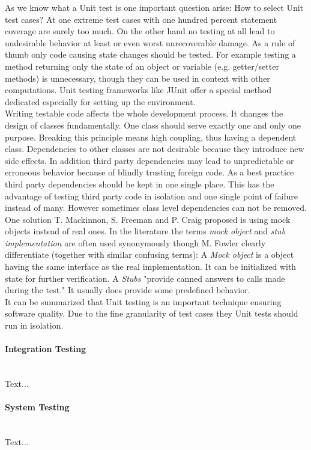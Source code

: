 \documentclass[12pt, notitlepage]{article}
\begin{document}
As we know what a Unit test is one important question arise: How to select Unit test cases? At one extreme test cases with one hundred percent statement coverage
are surely too much. On the other hand no testing at all lead to undesirable behavior at least or even worst unrecoverable damage. 
As a rule of thumb only code causing state changes should be tested. For example testing a method returning only the state of an object or variable (e.g. getter/setter methods) is unnecessary, though they can be used in context with other computations. Unit testing frameworks 
like JUnit\cite{junit} offer a special method dedicated especially for setting up the environment.\\
Writing testable code affects the whole development process. It changes the design of classes fundamentally. One class should serve exactly one and only one purpose. Breaking this principle means high coupling, thus having a dependent class. Dependencies to other classes are not desirable because they introduce new
side effects. In addition third party dependencies may lead to unpredictable or erroneous behavior because of blindly trusting foreign code.
As a best practice third party dependencies should be kept in one single place. This has the advantage of testing third party code in isolation 
and one single point of failure instead of many. However sometimes class level dependencies can not be removed.
One solution T. Mackinnon, S. Freeman and P. Craig proposed\cite{mock-objects} is using mock objects instead of real ones. In the literature the terms \textit{mock object} and \textit{stub implementation} are often used synonymously though M. Fowler clearly differentiate\cite{fowlermocks} (together with similar confusing terms): A \textit{Mock object} is a object having the same interface as the real implementation. It can be initialized with state for further verification. 
A \textit{Stubs} "provide canned answers to calls made during the test." It usually does provide some predefined behavior.\\ 
It can be summarized that Unit testing is an important technique ensuring software quality. Due to the fine granularity of test cases they Unit tests 
should run in isolation. 

\paragraph{Integration Testing} ~\\
Text...
\paragraph{System Testing} ~\\
Text...
\end{document}
